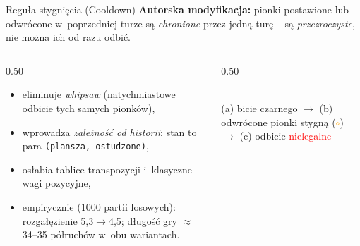 \documentclass[aspectratio=169]{beamer}
\newcommand{\othbg}[2]{%
  \fill[boardgreen] (0,0) rectangle (#1,#2);
  \draw[black!45] (0,0) grid (#1,#2);
  \draw[black!85,very thick] (0,0) rectangle (#1,#2);}
\newcommand{\othB}[2]{\shade[ball color=black!82] (#1,#2) circle(0.34);
  \draw[black,thin] (#1,#2) circle(0.34);}
\newcommand{\othW}[2]{\shade[ball color=white] (#1,#2) circle(0.34);
  \draw[black!70,thin] (#1,#2) circle(0.34);}
\newcommand{\othcool}[2]{\draw[orange,line width=1.3pt] (#1,#2) circle(0.46);}
\newcommand{\othmove}[2]{\draw[black!85,dashed,line width=1pt] (#1,#2) circle(0.36);}
\newcommand{\othx}[2]{\draw[red,line width=1.3pt] (#1,#2) circle(0.42);
  \draw[red,line width=1.4pt] ({#1-0.25},{#2-0.25})--({#1+0.25},{#2+0.25});
  \draw[red,line width=1.4pt] ({#1-0.25},{#2+0.25})--({#1+0.25},{#2-0.25});}
\begin{document}
\begin{frame}{Reguła stygnięcia (Cooldown)}
\textbf{Autorska modyfikacja:} pionki postawione lub odwrócone w~poprzedniej turze są \emph{chronione}
przez jedną turę -- są \emph{przezroczyste}, nie można ich od razu odbić.
\begin{columns}[c]
\begin{column}{0.50\textwidth}
\begin{itemize}\small
  \item eliminuje \emph{whipsaw} (natychmiastowe odbicie tych samych pionków),
  \item wprowadza \emph{zależność od historii}: stan to para \texttt{(plansza, ostudzone)},
  \item osłabia tablice transpozycji i~klasyczne wagi pozycyjne,
  \item empirycznie (1000 partii losowych): rozgałęzienie 5,3$\to$4,5; długość gry $\approx$34--35
        półruchów w~obu wariantach.
\end{itemize}
\end{column}
\begin{column}{0.50\textwidth}\centering
{}\;
\;
\\[3pt]{\scriptsize (a) bicie czarnego $\to$ (b) odwrócone pionki stygną
(\textcolor{orange}{$\circ$}) $\to$ (c) odbicie \textcolor{red}{nielegalne}}
\end{column}
\end{columns}
\end{frame}
\end{document}

